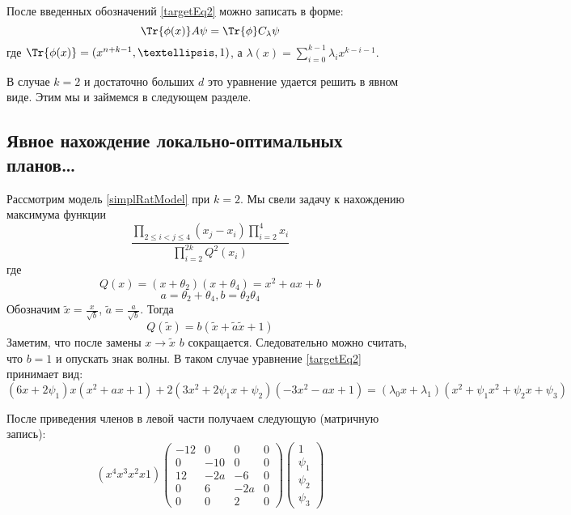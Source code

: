 После введенных обозначений \eqref{targetEq2} можно записать в форме:
\begin{equation}
\Tr{\phi(x)} A\psi = \Tr{\phi}C_\lambda\psi
\end{equation}
где $\Tr{\phi(x)} = (x^{n+k-1},…,1)$, а $\lambda(x) = \sum\limits_{i=0}^{k-1}\lambda_i x^{k-i-1}$.

В случае $k=2$ и достаточно больших $d$ это уравнение удается решить в явном виде. Этим мы и займемся в следующем разделе.
\subsection{Явное нахождение локально-оптимальных планов…}

Рассмотрим модель \eqref{simplRatModel} при $k=2$. Мы свели задачу к нахождению максимума функции
\begin{equation}
\frac{\prod\limits_{2\leq i < j \leq 4} (x_j - x_i) \prod\limits_{i=2}^4x_i}{\prod\limits_{i=2}^{2k}Q^2(x_i)}
\end{equation}
где  
$$Q(x) = (x+\theta_2)(x+\theta_4) = x^2 + ax + b$$
$$ a= \theta_2 + \theta_4, b = \theta_2\theta_4$$
Обозначим $\tilde{x} = \frac{x}{\sqrt{b}}$, $\tilde{a} = \frac{a}{\sqrt{b}}$. Тогда 
$$ Q(\tilde{x}) = b(\tilde{x} + \tilde{a}\tilde{x} + 1)$$
Заметим, что после замены $x \rightarrow \tilde{x}$  $b$ сокращается. Следовательно можно считать, что $b=1$ и опускать знак волны.  В таком случае уравнение \eqref{targetEq2} принимает вид:
\begin{equation}
(6x + 2 \psi_{1})x(x^2 + ax + 1) + 2(3x^2 + 2\psi_1 x + \psi_2) (-3x^2 - ax +1) = (\lambda_0 x + \lambda_1)(x^2 + \psi_1x^2+\psi_2 x + \psi_3)
\end{equation}

После приведения членов в левой части получаем следующую (матричную запись):
\begin{equation}
(x^4 x^3 x^2 x 1) \begin{pmatrix} -12 & 0 & 0 & 0 \\ 0 & -10 & 0 & 0 \\ 12 & -2a & -6 & 0 \\ 0 & 6 & -2a & 0 \\ 0 & 0 & 2 & 0 \end{pmatrix}  \begin{pmatrix} 1 \\ \psi_1 \\ \psi_2 \\ \psi_3 \end{pmatrix}
\end{equation}


